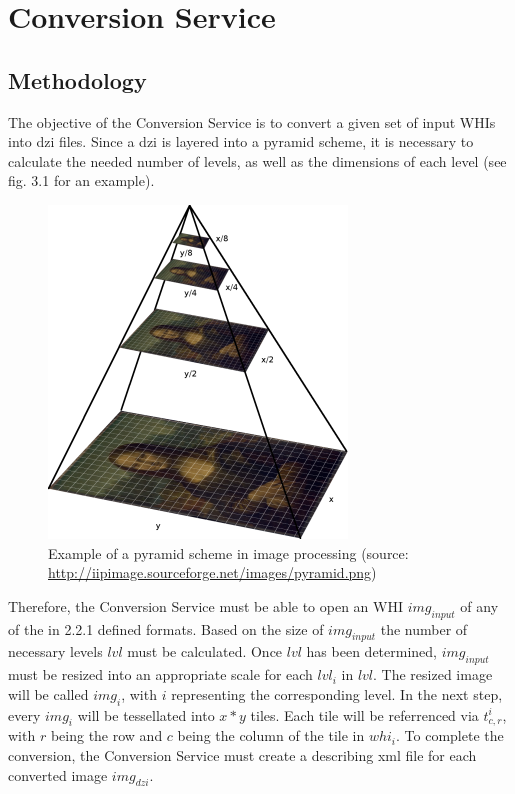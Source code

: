 \chapter{Conversion Service}

\section{Methodology}

The objective of the Conversion Service is to convert a given set of input WHIs into dzi files. Since a dzi is layered into a pyramid scheme, it is necessary to calculate the needed number of levels, as well as the dimensions of each level (see fig. 3.1 for an example).

\begin{figure}[H]
	\begin{center}
		\includegraphics[scale=0.5]{img/pyramid.png}
		\caption{Example of a pyramid scheme in image processing (source: \url{http://iipimage.sourceforge.net/images/pyramid.png})}
		\label{fig:fig3.1}
	\end{center}
\end{figure}

Therefore, the Conversion Service must be able to open an WHI $img_{input}$ of any of the in 2.2.1 defined formats. Based on the size of $img_{input}$ the number of necessary levels $lvl$ must be calculated. Once $lvl$ has been determined, $img_{input}$ must be resized into an appropriate scale for each $lvl_i$ in $lvl$. The resized image will be called $img_i$, with $i$ representing the corresponding level. In the next step, every $img_i$ will be tessellated into $x*y$ tiles. Each tile will be referrenced via $t^i_{c,r}$, with $r$ being the row and $c$ being the column of the tile in $whi_i$. To complete the conversion, the Conversion Service must create a describing xml file for each converted image $img_{dzi}$.


